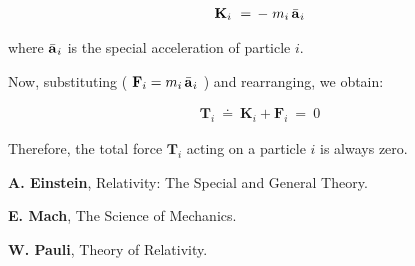 \documentclass[10pt,fleqn]{article}
\begin{document}
\par \vspace{-0.60em}
\begin{eqnarray*}
\mathbf{K}_i ~=\, - \; m_i \, \bar{\mathbf{a}}_{\hspace{+0.045em}i}
\end{eqnarray*}
\par \vspace{+0.60em}
\noindent where $\bar{\mathbf{a}}_{\hspace{+0.045em}i}$ is the special acceleration of particle $i$.
\par \vspace{+0.60em}
\noindent Now, substituting ( $\mathbf{F}_i = m_i \, \bar{\mathbf{a}}_{\hspace{+0.045em}i}$ ) and rearranging, we obtain:
\par \vspace{-0.81em}
\begin{eqnarray*}
\mathbf{T}_i ~\doteq~ \mathbf{K}_i + \mathbf{F}_i ~=~ 0
\end{eqnarray*}
\par \vspace{+0.60em}
\noindent Therefore, the total force $\mathbf{T}_i$ acting on a particle $i$ is always zero.

\vspace{+0.60em}

\par {}

\bigskip \smallskip

\par \noindent \textbf{A. Einstein}, Relativity: The Special and General Theory.
\bigskip \smallskip
\par \noindent \textbf{E. Mach}, The Science of Mechanics.
\bigskip \smallskip
\par \noindent \textbf{W. Pauli}, Theory of Relativity.

\newpage

\par {}

\smallskip

\par {}
\end{document}
